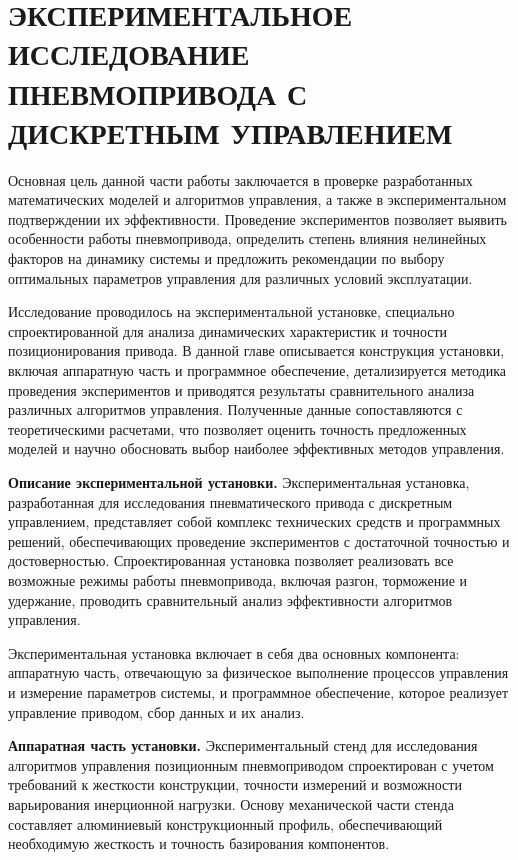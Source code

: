 \chapter{ЭКСПЕРИМЕНТАЛЬНОЕ ИССЛЕДОВАНИЕ ПНЕВМОПРИВОДА С ДИСКРЕТНЫМ УПРАВЛЕНИЕМ}\label{ch:ch4}
Основная цель данной части работы заключается в проверке разработанных
математических моделей и алгоритмов управления,
а также в экспериментальном подтверждении их эффективности. Проведение экспериментов позволяет
выявить особенности работы пневмопривода, определить степень влияния
нелинейных факторов на динамику системы и предложить рекомендации по
выбору оптимальных параметров управления для различных условий эксплуатации.

Исследование проводилось на экспериментальной установке,
специально спроектированной для анализа динамических характеристик и
точности позиционирования привода. В данной главе описывается конструкция
установки, включая аппаратную часть и программное обеспечение, детализируется
методика проведения экспериментов и приводятся результаты сравнительного
анализа различных алгоритмов управления. Полученные данные сопоставляются с
теоретическими расчетами, что позволяет оценить точность предложенных моделей
и научно обосновать выбор наиболее эффективных методов управления.

\textbf{Описание экспериментальной установки.}
Экспериментальная установка, разработанная для исследования пневматического привода с
дискретным управлением, представляет собой комплекс технических средств и
программных решений, обеспечивающих проведение экспериментов с достаточной точностью и достоверностью.
Спроектированная установка позволяет реализовать все возможные режимы работы
пневмопривода, включая разгон, торможение и удержание,
проводить сравнительный анализ эффективности алгоритмов управления.

Экспериментальная установка включает в себя два основных компонента:
аппаратную часть, отвечающую за физическое выполнение процессов управления и
измерение параметров системы, и программное обеспечение, которое реализует
управление приводом, сбор данных и их анализ.

\textbf{Аппаратная часть установки.}
Экспериментальный стенд для исследования алгоритмов управления позиционным пневмоприводом
спроектирован с учетом требований к жесткости конструкции, точности измерений и возможности
варьирования инерционной нагрузки. Основу механической части стенда составляет алюминиевый
конструкционный профиль, обеспечивающий необходимую жесткость и точность базирования компонентов.

